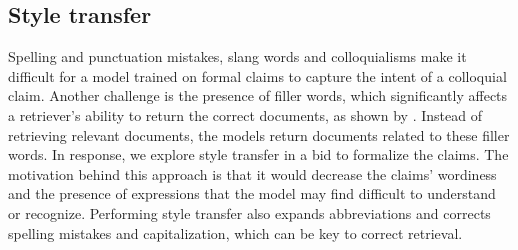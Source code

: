\subsection{Style transfer}
Spelling and punctuation mistakes, slang words and colloquialisms make it difficult for a model trained on formal claims to capture the intent of a colloquial claim. Another challenge is the presence of filler words, which significantly affects a retriever's ability to return the correct documents, as shown by \citet{colloquial}. Instead of retrieving relevant documents, the models return documents related to these filler words. In response, we explore style transfer in a bid to formalize the claims. The motivation behind this approach is that it would decrease the claims' wordiness and the presence of expressions that the model may find difficult to understand or recognize. Performing style transfer also expands abbreviations and corrects spelling mistakes and capitalization, which can be key to correct retrieval. 

